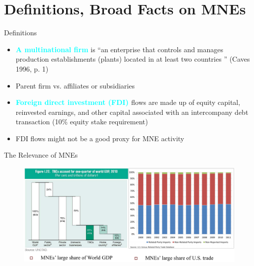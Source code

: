\documentclass[10pt,hyperref={CJKbookmarks=true},xcolor=dvipsnames,aspectratio=169]{beamer}
\begin{document}
\section{Definitions, Broad Facts on MNEs}
\begin{frame}{Definitions }

\begin{itemize}
\item \textbf{\textcolor{cyan}{A multinational firm}} is “an enterprise
that controls and manages production establishments (plants) located
in at least two countries ” (Caves 1996, p. 1) 
\item Parent firm vs. affiliates or subsidiaries 
\item \textbf{\textcolor{cyan}{Foreign direct investment (FDI) }}flows are
made up of equity capital, reinvested earnings, and other capital
associated with an intercompany debt transaction (10\% equity stake
requirement) 
\item FDI flows might not be a good proxy for MNE activity 
\end{itemize}
\end{frame}

\begin{frame}{The Relevance of MNEs }


\begin{figure}


\begin{centering}
\includegraphics[width=12cm]{fig/fdi/glo13}
\par\end{centering}

\end{figure}



\end{frame}
\end{document}
